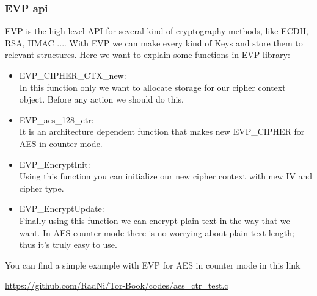 \subsubsection{EVP api}
EVP is the high level API for several kind of cryptography methods, like ECDH, RSA, HMAC .... With EVP we can make every kind of Keys and store them to relevant structures.
Here we want to explain some functions in EVP library:
\begin{itemize}
	\item EVP\_CIPHER\_CTX\_new: \\
	In this function only we want to allocate storage for our cipher context object. Before any action we should do this.
	\item EVP\_aes\_128\_ctr: \\
	It is an architecture dependent function that makes new EVP\_CIPHER for AES in counter mode.
	\item EVP\_EncryptInit: \\
	Using this function you can initialize our new cipher context with new IV and cipher type.
	\item EVP\_EncryptUpdate: \\
	Finally using this function we can encrypt plain text in the way that we want. In AES counter mode there is no worrying about plain text length; thus it's truly easy to use.
\end{itemize}
You can find a simple example with EVP for AES in counter mode in this link

\url{https://github.com/RadNi/Tor-Book/codes/aes\_ctr\_test.c}